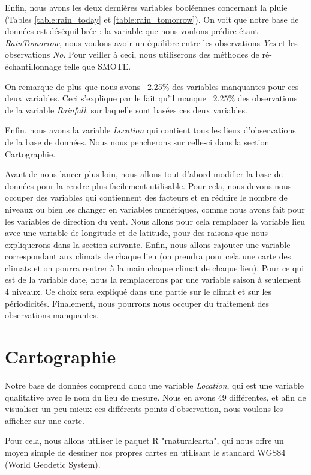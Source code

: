 \documentclass{article}
\begin{document}
Enfin, nous avons les deux dernières variables booléennes concernant la pluie (Tables \ref{table:rain_today} et \ref{table:rain_tomorrow}). On voit que notre base de données est déséquilibrée : la variable que nous voulons prédire étant \emph{RainTomorrow}, nous voulons avoir un équilibre entre les observations \emph{Yes} et les observations \emph{No}. Pour veiller à ceci, nous utiliserons des méthodes de ré-échantillonnage telle que SMOTE. 

On remarque de plus que nous avons ~2.25\% des variables manquantes pour ces deux variables. Ceci s'explique par le fait qu'il manque ~2.25\% des observations de la variable \emph{Rainfall}, sur laquelle sont basées ces deux variables.

Enfin, nous avons la variable \emph{Location} qui contient tous les lieux d'observations de la base de données. Nous nous pencherons sur celle-ci dans la section Cartographie. 

Avant de nous lancer plus loin, nous allons tout d'abord modifier la base de données pour la rendre plus facilement utilisable. Pour cela, nous devons nous occuper des variables qui contiennent des facteurs et en réduire le nombre de niveaux ou bien les changer en variables numériques, comme nous avons fait pour les variables de direction du vent. Nous allons pour cela remplacer la variable lieu avec une variable de longitude et de latitude, pour des raisons que nous expliquerons dans la section suivante. Enfin, nous allons rajouter une variable correspondant aux climats de chaque lieu (on prendra pour cela une carte des climats et on pourra rentrer à la main chaque climat de chaque lieu). Pour ce qui est de la variable date, nous la remplacerons par une variable saison à seulement 4 niveaux. Ce choix sera expliqué dans une partie sur le climat et sur les périodicités. Finalement, nous pourrons nous occuper du traitement des observations manquantes. 

\section{Cartographie}

Notre base de données comprend donc une variable \emph{Location}, qui est une variable qualitative avec le nom du lieu de mesure. Nous en avons 49 différentes, et afin de visualiser un peu mieux ces différents points d'observation, nous voulons les afficher sur une carte. 

Pour cela, nous allons utiliser le paquet R "rnaturalearth", qui nous offre un moyen simple de dessiner nos propres cartes en utilisant le standard WGS84 (World Geodetic System).
\end{document}
